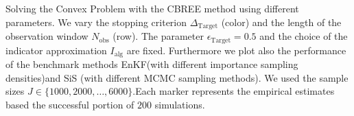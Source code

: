 Solving the Convex Problem with the CBREE method using  different parameters. We vary the stopping criterion $\Delta_{\text{Target}}$ (color) and the length of the observation window $N_\text{obs}$ (row). The parameter $\epsilon_{\text{Target}} = 0.5$ and the choice of the indicator approximation $I_\text{alg}$ are fixed. Furthermore we plot also the performance of the benchmark methods EnKF(with different importance sampling densities)and SiS (with different MCMC sampling methods). We used the sample sizes $J \in \{1000, 2000, \ldots, 6000\}$.Each marker represents the empirical estimates based the successful portion of $200$ simulations.